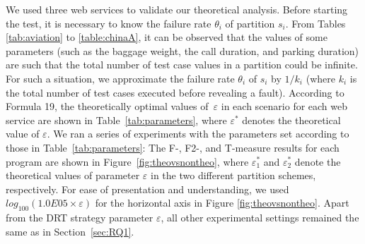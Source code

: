\documentclass[10pt,journal,compsoc]{IEEEtran}
\begin{document}
We used three web services to validate our theoretical analysis.
Before starting the test, it is necessary to know the failure rate $\theta_i$ of partition $s_i$. From Tables \ref{tab:aviation} to \ref{table:chinaA}, it can be observed that the values of some parameters (such as the baggage weight, the call duration, and parking duration) are such that the total number of test case values in a partition could be infinite. For such a situation, we approximate the failure rate $\theta_i$ of $s_i$ by $1 / k_i$ (where $k_i$ is the total number of test cases executed before revealing a fault).
According to Formula 19, the theoretically optimal values of~$\varepsilon$ in each scenario for each web service are shown in Table~\ref{tab:parameters}, where $\varepsilon^{*}$ denotes the theoretical value of $\varepsilon$.
We ran a series of experiments with the parameters set according to those in Table~\ref{tab:parameters}:
The F-, F2-, and T-measure results for each  program are shown in Figure~\ref{fig:theovsnontheo}, where $\varepsilon_1^{*}$ and $\varepsilon_2^{*}$ denote the theoretical values of parameter $\varepsilon$ in the two different partition schemes, respectively.
For ease of presentation and understanding, we used $log_{100}(1.0E05 \times \varepsilon)$ for the horizontal axis in Figure \ref{fig:theovsnontheo}.
Apart from the DRT strategy parameter $\varepsilon$, all other experimental settings remained the same as in Section~\ref{sec:RQ1}.
\end{document}
